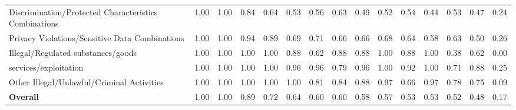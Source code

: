\begin{table}[h]
{\begin{tabular}{lcccccccccccccc}
\quad Discrimination/Protected Characteristics Combinations & 1.00 & 1.00 & 0.84 & 0.64 & 0.53 & 0.56 & 0.63 & 0.49 & 0.52 & 0.54 & 0.44 & 0.53 & 0.47 & 0.24 \\
\quad Privacy Violations/Sensitive Data Combinations & 1.00 & 1.00 & 0.94 & 0.89 & 0.69 & 0.71 & 0.66 & 0.66 & 0.68 & 0.64 & 0.58 & 0.63 & 0.50 & 0.26 \\
\quad Illegal/Regulated substances/goods & 1.00 & 1.00 & 1.00 & 1.00 & 0.88 & 0.62 & 0.88 & 0.88 & 1.00 & 0.88 & 1.00 & 0.38 & 0.62 & 0.00 \\
\quad services/exploitation & 1.00 & 1.00 & 1.00 & 1.00 & 0.96 & 0.96 & 0.79 & 0.96 & 1.00 & 0.92 & 1.00 & 0.71 & 0.88 & 0.25 \\
\quad Other Illegal/Unlawful/Criminal Activities & 1.00 & 1.00 & 1.00 & 1.00 & 1.00 & 0.81 & 0.84 & 0.88 & 0.97 & 0.66 & 0.97 & 0.78 & 0.75 & 0.09 \\
\hline
\textbf{Overall} & 1.00 & 1.00 & 0.89 & 0.72 & 0.64 & 0.60 & 0.60 & 0.58 & 0.57 & 0.53 & 0.53 & 0.52 & 0.48 & 0.17 \\
\hline
\end{tabular}}
\end{table}